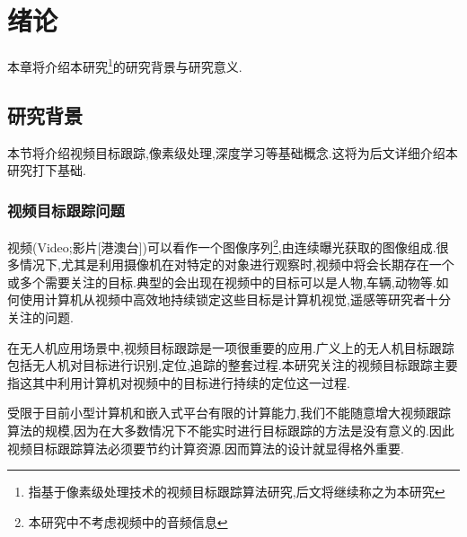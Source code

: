 
\chapter{绪论}
本章将介绍本研究\footnote{指基于像素级处理技术的视频目标跟踪算法研究,后文将继续称之为本研究}的研究背景与研究意义.

\section{研究背景}
本节将介绍视频目标跟踪,像素级处理,深度学习等基础概念.这将为后文详细介绍本研究打下基础.

\subsection{视频目标跟踪问题}
视频(Video;影片[港澳台])可以看作一个图像序列\footnote{本研究中不考虑视频中的音频信息},由连续曝光获取的图像组成.很多情况下,尤其是利用摄像机在对特定的对象进行观察时,视频中将会长期存在一个或多个需要关注的目标.典型的会出现在视频中的目标可以是人物,车辆,动物等.如何使用计算机从视频中高效地持续锁定这些目标是计算机视觉,遥感等研究者十分关注的问题.
\par
在无人机应用场景中,视频目标跟踪是一项很重要的应用.广义上的无人机目标跟踪包括无人机对目标进行识别,定位,追踪的整套过程.本研究关注的视频目标跟踪主要指这其中利用计算机对视频中的目标进行持续的定位这一过程.
\par
受限于目前小型计算机和嵌入式平台有限的计算能力,我们不能随意增大视频跟踪算法的规模,因为在大多数情况下不能实时进行目标跟踪的方法是没有意义的.因此视频目标跟踪算法必须要节约计算资源.因而算法的设计就显得格外重要.

